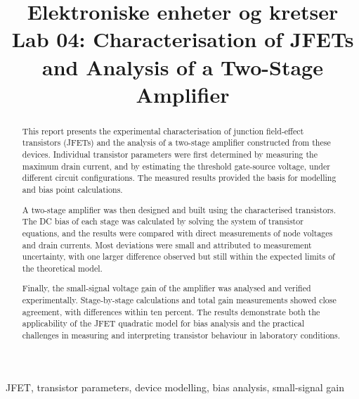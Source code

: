 \documentclass[conference]{IEEEtran}
\begin{document}
\title{Elektroniske enheter og kretser\\
Lab 04: Characterisation of JFETs and Analysis of a Two-Stage Amplifier}

\author{
}

\maketitle


\begin{abstract}
This report presents the experimental characterisation of junction field-effect transistors (JFETs) and the analysis of a two-stage amplifier constructed from these devices.  
Individual transistor parameters were first determined by measuring the maximum drain current, and by estimating the threshold gate-source voltage, under different circuit configurations.  
The measured results provided the basis for modelling and bias point calculations.  

A two-stage amplifier was then designed and built using the characterised transistors.  
The DC bias of each stage was calculated by solving the system of transistor equations, and the results were compared with direct measurements of node voltages and drain currents.  
Most deviations were small and attributed to measurement uncertainty, with one larger difference observed but still within the expected limits of the theoretical model.  

Finally, the small-signal voltage gain of the amplifier was analysed and verified experimentally.  
Stage-by-stage calculations and total gain measurements showed close agreement, with differences within ten percent.  
The results demonstrate both the applicability of the JFET quadratic model for bias analysis and the practical challenges in measuring and interpreting transistor behaviour in laboratory conditions.  
\end{abstract}

\begin{IEEEkeywords}
JFET, transistor parameters, device modelling, bias analysis, small-signal gain
\end{IEEEkeywords}
\end{document}
